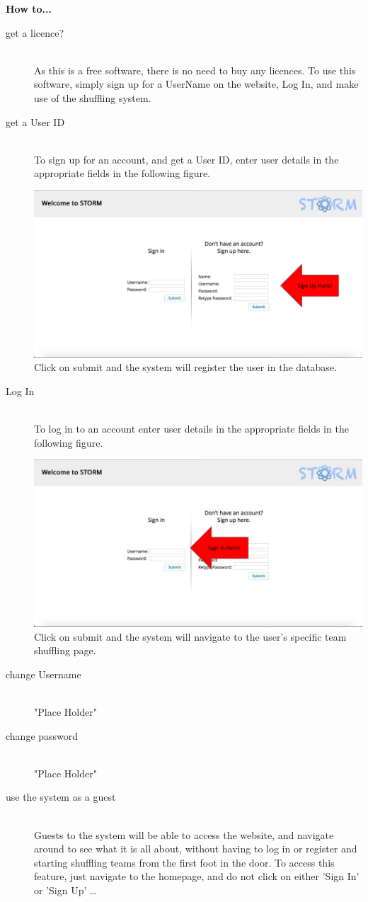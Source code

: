 {\Large \textbf{How to...} \par}

\begin{description}
 	\item[get a licence?] \hfill \\
 		As this is a free software, there is no need to buy any licences. To use this software, simply 
		sign up for a UserName on the website, Log In, and make use of the shuffling system.
 	\item[get a User ID] \hfill \\
		To sign up for an account, and get a User ID, enter user details in the appropriate fields in the 		following figure.\par
   		 \includegraphics[width=13cm]{./graphics/StormUMSU1.jpg}
   		Click on submit and the system will register the user in the database.
	\item[Log In] \hfill \\
 		To log in to an account enter user details in the appropriate fields in the following figure.\par
   		 \includegraphics[width=13cm]{./graphics/StormUMSU2.jpg}
   		Click on submit and the system will navigate to the user's specific team shuffling page.
    	\item[change Username] \hfill \\
 		"Place Holder"
	\item[change password] \hfill \\
 		"Place Holder"
	\item[use the system as a guest] \hfill \\
 		Guests to the system will be able to access the website, and navigate around to see what it
		is all about, without having to log in or register and starting shuffling teams from the first foot in 		the door. To access this feature, just navigate to the homepage, and do not click on either 		'Sign In' or 'Sign Up'  \ldots
\end{description}